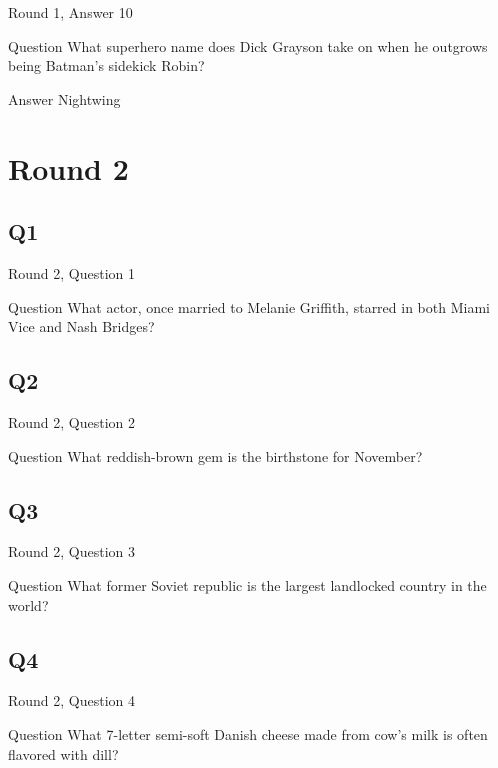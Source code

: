 \documentclass[11pt]{beamer}
\begin{document}
\begin{frame}[t]{Round 1, Answer 10}
\vspace{2em}
\begin{block}{Question}
What superhero name does Dick Grayson take on when he outgrows being Batman's sidekick Robin\@?
\end{block}
\pause{}
\begin{block}{Answer}
Nightwing
\end{block}
\end{frame}
    

\section{Round 2}
    

\subsection*{Q1}
\begin{frame}[t]{Round 2, Question 1}
\vspace{2em}
\begin{block}{Question}
What actor, once married to Melanie Griffith, starred in both Miami Vice and Nash Bridges\@?
\end{block}
\end{frame}
    

\subsection*{Q2}
\begin{frame}[t]{Round 2, Question 2}
\vspace{2em}
\begin{block}{Question}
What reddish-brown gem is the birthstone for November\@?
\end{block}
\end{frame}
    

\subsection*{Q3}
\begin{frame}[t]{Round 2, Question 3}
\vspace{2em}
\begin{block}{Question}
What former Soviet republic is the largest landlocked country in the world\@?
\end{block}
\end{frame}
    

\subsection*{Q4}
\begin{frame}[t]{Round 2, Question 4}
\vspace{2em}
\begin{block}{Question}
What 7-letter semi-soft Danish cheese made from cow's milk is often flavored with dill\@?
\end{block}
\end{frame}
    
\end{document}
